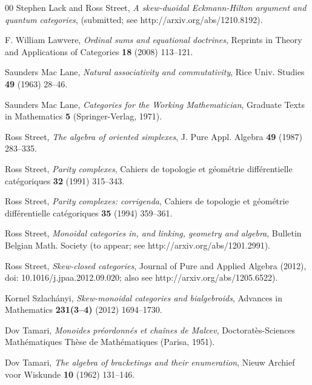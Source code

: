 \documentclass[a4paper,12pt,reqno]{amsart}
\theoremstyle{definition}
\theoremstyle{fact}
\theoremstyle{genquest}
\theoremstyle{step}
\begin{document}
\begin{thebibliography}{00}
 Stephen Lack and Ross Street, \textit{A skew-duoidal Eckmann-Hilton argument and quantum categories}, (submitted; see http://arxiv.org/abs/1210.8192).\label{SkEH}

 F. William Lawvere, \textit{Ordinal sums and equational doctrines}, Reprints in Theory and Applications of Categories \textbf{18} (2008) 113--121.\label{osed}

 Saunders Mac Lane, \textit{Natural associativity and commutativity}, Rice Univ. Studies \textbf{49} (1963) 28--46.\label{Rice}

 Saunders Mac Lane, \textit{Categories for the Working Mathematician}, Graduate Texts in Mathematics \textbf{5} (Springer-Verlag, 1971).\label{CWM} 

 Ross Street, \textit{The algebra of oriented simplexes}, J. Pure Appl. Algebra \textbf{49} (1987) 283--335.\label{aos}

 Ross Street, \textit{Parity complexes}, Cahiers de topologie et g\'eom\'etrie diff\'erentielle cat\'egoriques \textbf{32} (1991) 315--343.\label{pc}

 Ross Street, \textit{Parity complexes: corrigenda}, Cahiers de topologie et g\'eom\'etrie diff\'erentielle cat\'egoriques \textbf{35} (1994) 359--361.\label{pc:c}

 Ross Street, \textit{Monoidal categories in, and linking, geometry and algebra}, Bulletin Belgian Math. Society  (to appear; see http://arxiv.org/abs/1201.2991).\label{dlVP}

 Ross Street, \textit{Skew-closed categories}, Journal of Pure and Applied Algebra (2012), doi: 10.1016/j.jpaa.2012.09.020; also see http://arxiv.org/abs/1205.6522).\label{scc}

 Kornel Szlach\'anyi, \textit{Skew-monoidal categories and bialgebroids}, Advances in Mathematics \textbf{231(3--4)} (2012) 1694--1730.
\label{Szl2012}

 Dov Tamari, \textit{Monoides pr\'eordonn\'es et cha\^ines de Malcev}, 
Doctorat\`es-Sciences Math\'ematiques Th\`ese de Math\'ematiques (Parisa, 1951).\label{Tamari51} 

 Dov Tamari, \textit{The algebra of bracketings and their enumeration}, Nieuw Archief voor Wiskunde \textbf{10} (1962) 131--146.\label{Tamari62}




\end{thebibliography}
\end{document}
